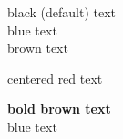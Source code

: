 black (default) text \\
\color{blue}
blue text \\
{ \color{brown} brown text }
\begin{center}
  \color{red}
  centered red text
\end{center}
\textbf{ \color{brown}
bold brown text } \\
blue text
